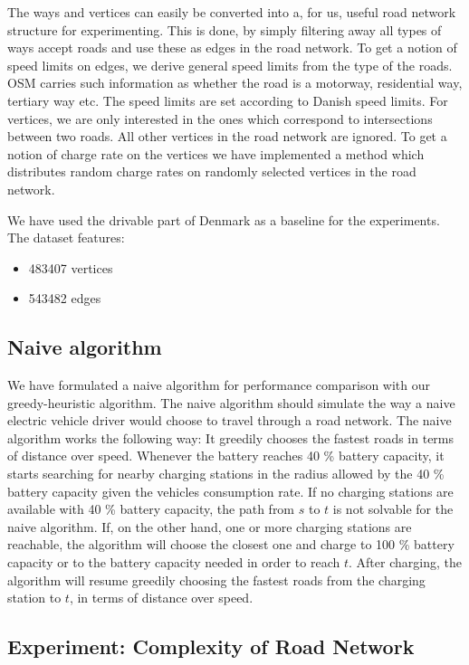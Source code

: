 The ways and vertices can easily be converted into a, for us, useful road network structure for experimenting. This is done, by simply filtering away all types of ways accept roads and use these as edges in the road network. To get a notion of speed limits on edges, we derive general speed limits from the type of the roads. OSM carries such information as whether the road is a motorway, residential way, tertiary way etc. The speed limits are set according to Danish speed limits. For vertices, we are only interested in the ones which correspond to intersections between two roads. All other vertices in the road network are ignored. To get a notion of charge rate on the vertices we have implemented a method which distributes random charge rates on randomly selected vertices in the road network.

We have used the drivable part of Denmark as a baseline for the experiments. The dataset features:
\begin{itemize}
    \item 483407 vertices
    \item 543482 edges
\end{itemize}

\subsection{Naive algorithm}
\label{sub:naivealgorithm}
We have formulated a naive algorithm for performance comparison with our greedy-heuristic algorithm. The naive algorithm should simulate the way a naive electric vehicle driver would choose to travel through a road network. The naive algorithm works the following way: It greedily chooses the fastest roads in terms of distance over speed. Whenever the battery reaches 40 \% battery capacity, it starts searching for nearby charging stations in the radius allowed by the 40 \% battery capacity given the vehicles consumption rate. If no charging stations are available with 40 \% battery capacity, the path from $s$ to $t$ is not solvable for the naive algorithm. If, on the other hand, one or more charging stations are reachable, the algorithm will choose the closest one and charge to 100 \% battery capacity or to the battery capacity needed in order to reach $t$. After charging, the algorithm will resume greedily choosing the fastest roads from the charging station to $t$, in terms of distance over speed.

\subsection{Experiment: Complexity of Road Network}

